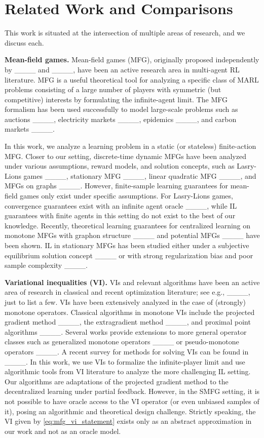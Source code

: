 \section{Related Work and Comparisons}
This work is situated at the intersection of multiple areas of research, and we discuss each.

\textbf{Mean-field games.}
Mean-field games (MFG), originally proposed independently by ____ and ____, have been an active research area in multi-agent RL literature.
MFG is a useful theoretical tool for analyzing a specific class of MARL problems consisting of a large number of players with symmetric (but competitive) interests by formulating the infinite-agent limit.
The MFG formalism has been used successfully to model large-scale problems such as
auctions ____,
electricity markets ____,
epidemics ____, 
and carbon markets ____.


In this work, we analyze a learning problem in a static (or stateless) finite-action MFG.
Closer to our setting, discrete-time dynamic MFGs have been analyzed under various assumptions, reward models, and solution concepts, such as Lasry-Lions games ____, stationary MFG ____, linear quadratic MFG ____, and MFGs on graphs ____.
However, finite-sample learning guarantees for mean-field games only exist under specific assumptions.
For Lasry-Lions games, convergence guarantees exist with an infinite agent oracle ____, while IL guarantees with finite agents in this setting do not exist to the best of our knowledge.
Recently, theoretical learning guarantees for centralized learning on monotone MFGs with graphon structure ____ and potential MFGs ____ have been shown.
IL in stationary MFGs has been studied either under a subjective equilibrium solution concept ____ or with strong regularization bias and  poor sample complexity ____.

\textbf{Variational inequalities (VI).}
VIs and relevant algorithms have been an active area of research in classical and recent optimization literature; see e.g., ____, just to list a few.
VIs have been extensively analyzed in the case of (strongly) monotone operators.
Classical algorithms in monotone VIs include the projected gradient method ____, the extragradient method ____, and proximal point algorithms ____.
Several works provide extensions to more general operator classes such as generalized monotone operators ____ or pseudo-monotone operators ____.
A recent survey for methods for solving VIs can be found in ____.
In this work, we use VIs to formalize the infinite-player limit and use algorithmic tools from VI literature to analyze the more challenging IL setting.
Our algorithms are adaptations of the projected gradient method to the decentralized learning under partial feedback.
However, in the SMFG setting, it is not possible to have oracle access to the VI operator (or even unbiased samples of it), posing an algorithmic and theoretical design challenge.
Strictly speaking, the VI given by \eqref{eq:mfg_vi_statement} exists only as an abstract approximation in our work and not as an oracle model.

